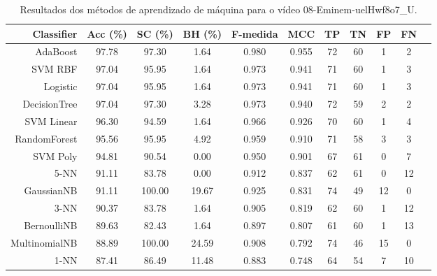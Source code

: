 \begin{table}[!htb]
\centering
\caption{Resultados dos métodos de aprendizado de máquina para o vídeo 08-Eminem-uelHwf8o7_U.}
\label{tab:08-Eminem-uelHwf8o7_U}
\begin{tabular}{r|c|c|c|c|c|c|c|c|c|c}
\hline\hline
Classifier & Acc (\%) & SC (\%) & BH (\%) & F-medida & MCC & TP & TN & FP & FN \\ \hline
AdaBoost & 97.78 & 97.30 & 1.64 & 0.980 & 0.955 & 72 & 60 & 1 & 2 \\ 
SVM RBF & 97.04 & 95.95 & 1.64 & 0.973 & 0.941 & 71 & 60 & 1 & 3 \\ 
Logistic & 97.04 & 95.95 & 1.64 & 0.973 & 0.941 & 71 & 60 & 1 & 3 \\ 
DecisionTree & 97.04 & 97.30 & 3.28 & 0.973 & 0.940 & 72 & 59 & 2 & 2 \\ 
SVM Linear & 96.30 & 94.59 & 1.64 & 0.966 & 0.926 & 70 & 60 & 1 & 4 \\ 
RandomForest & 95.56 & 95.95 & 4.92 & 0.959 & 0.910 & 71 & 58 & 3 & 3 \\ 
SVM Poly & 94.81 & 90.54 & 0.00 & 0.950 & 0.901 & 67 & 61 & 0 & 7 \\ 
5-NN & 91.11 & 83.78 & 0.00 & 0.912 & 0.837 & 62 & 61 & 0 & 12 \\ 
GaussianNB & 91.11 & 100.00 & 19.67 & 0.925 & 0.831 & 74 & 49 & 12 & 0 \\ 
3-NN & 90.37 & 83.78 & 1.64 & 0.905 & 0.819 & 62 & 60 & 1 & 12 \\ 
BernoulliNB & 89.63 & 82.43 & 1.64 & 0.897 & 0.807 & 61 & 60 & 1 & 13 \\ 
MultinomialNB & 88.89 & 100.00 & 24.59 & 0.908 & 0.792 & 74 & 46 & 15 & 0 \\ 
1-NN & 87.41 & 86.49 & 11.48 & 0.883 & 0.748 & 64 & 54 & 7 & 10 \\ 
\hline\hline
\end{tabular}
\end{table}

